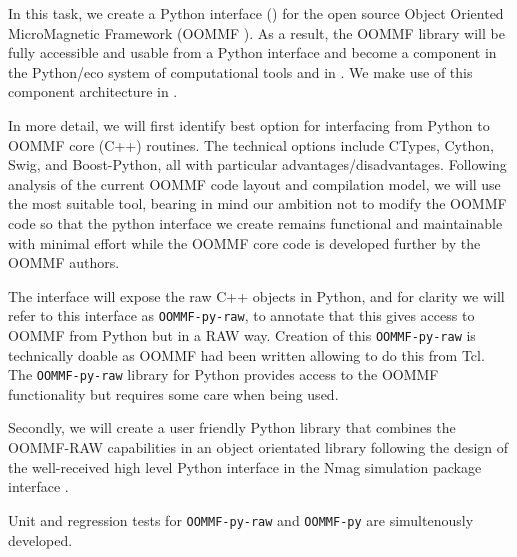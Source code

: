 \begin{workpackage}[id=component-architecture,wphases=0-48!.5,
  title=Component Architecture,lead=UV,
  PSRM=24,UVRM=8,SARM=16, USHRM=4, USORM=6]
\begin{tasklist}
\begin{task}[title=Improving the development workflow in mathematical software,lead=UV,PM=4]
  \end{task}


\begin{task}[lead=USO,id=oommf-python-interface,title=Python interface
  for OOMMF micromagneticc simulation library,PM=6]
  In this task, we create a Python interface
  () for the open source Object
  Oriented MicroMagnetic Framework (OOMMF \cite{OOMMF-url}).
  As a result, the OOMMF library will be
  fully accessible and usable from a Python interface and become a
  component in the Python/\Jupyter eco system of computational
  tools and in \TheProject. We make use of this component architecture in
  .

  In more detail, we will first identify best option for interfacing
  from Python to OOMMF core (C++) routines. The technical options
  include CTypes, Cython, Swig, and Boost-Python, all with particular
  advantages/disadvantages. Following analysis of the current OOMMF
  code layout and compilation model, we will use the most suitable
  tool, bearing in mind our ambition not to modify the OOMMF code so
  that the python interface we create remains functional and
  maintainable with minimal effort while the OOMMF core code is
  developed further by the OOMMF authors.

  The interface will expose the raw C++ objects in Python, and for
  clarity we will refer to this interface as \texttt{OOMMF-py-raw}, to
  annotate that this gives access to OOMMF from Python but in a RAW
  way. Creation of this \texttt{OOMMF-py-raw} is technically doable as
  OOMMF had been written allowing to do this from Tcl. The
  \texttt{OOMMF-py-raw} library for Python provides access to the
  OOMMF functionality but requires some care when being used.

  Secondly, we will create a user friendly Python library that
  combines the OOMMF-RAW capabilities in an object orientated library
  following the design of the well-received high level Python
  interface in the Nmag simulation package \cite{Fischbacher2007a}
  interface \cite{Nmag-url}.

  Unit and regression tests for \texttt{OOMMF-py-raw} and
  \texttt{OOMMF-py} are simultenously developed.



\end{task}
\end{tasklist}
\end{workpackage}
